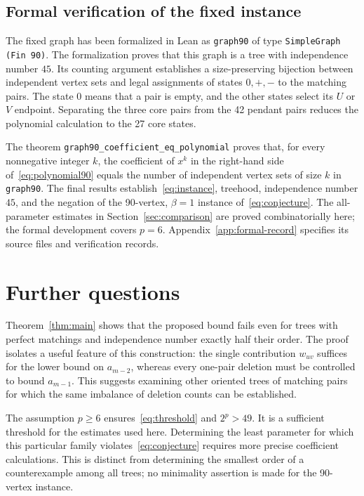 \documentclass[11pt,a4paper]{article}
\theoremstyle{remark}
\numberwithin{equation}{section}
\begin{document}
\subsection{Formal verification of the fixed instance}

The fixed graph has been formalized in Lean as
\nolinkurl{graph90} of type \texttt{SimpleGraph (Fin 90)}.
The formalization proves that this graph is a tree with
independence number $45$. Its counting argument establishes a
size-preserving bijection between independent vertex sets and legal
assignments of states $0,+,-$ to the matching pairs. The state $0$
means that a pair is empty, and the other states select its $U$ or $V$
endpoint. Separating the three core pairs from the 42 pendant pairs
reduces the polynomial calculation to the 27 core states.

The theorem \nolinkurl{graph90_coefficient_eq_polynomial} proves
that, for every nonnegative integer $k$, the coefficient of $x^k$
in the right-hand side of~\eqref{eq:polynomial90} equals the number
of independent vertex sets of size $k$ in \nolinkurl{graph90}.
The final results establish~\eqref{eq:instance}, treehood,
independence number $45$, and the negation of the 90-vertex,
$\beta=1$ instance of~\eqref{eq:conjecture}.
The all-parameter estimates in Section~\ref{sec:comparison} are
proved combinatorially here; the formal development covers $p=6$.
Appendix~\ref{app:formal-record} specifies its source files and
verification records.

\section{Further questions}\label{sec:discussion}

Theorem~\ref{thm:main} shows that the proposed bound fails even for
trees with perfect matchings and independence number exactly half
their order. The proof isolates a useful feature of this construction:
the single contribution $w_{uv}$ suffices for the lower bound on
$a_{m-2}$, whereas every one-pair deletion must be controlled to bound
$a_{m-1}$. This suggests examining other oriented trees of matching
pairs for which the same imbalance of deletion counts can be established.

The assumption $p\geq6$ ensures~\eqref{eq:threshold} and $2^p>49$.
It is a sufficient threshold for the estimates used here.
Determining the least parameter for which this particular family
violates~\eqref{eq:conjecture} requires more precise coefficient
calculations. This is distinct from determining the smallest order
of a counterexample among all trees; no minimality assertion is made
for the 90-vertex instance.
\end{document}
